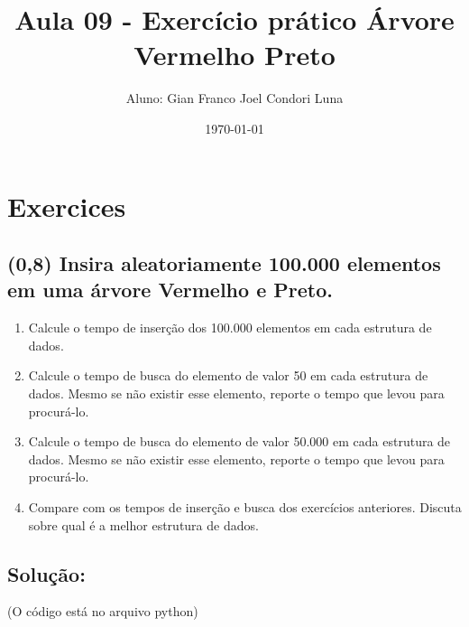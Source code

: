 \documentclass{article}
\title{Aula 09 - Exercício prático Árvore Vermelho Preto}
\author{Aluno: Gian Franco Joel Condori Luna}
\date{\today}
\begin{document}
\maketitle

\section*{Exercices}
\setcounter{section}{1}
\subsection {(0,8) Insira aleatoriamente 100.000 elementos em uma árvore Vermelho e Preto.}
\begin{enumerate}[label=\alph*)]
    \item Calcule o tempo de inserção dos 100.000 elementos em cada estrutura de dados.
    \item Calcule o tempo de busca do elemento de valor 50 em cada estrutura de dados.
    Mesmo se não existir esse elemento, reporte o tempo que levou para procurá-lo.
    \item Calcule o tempo de busca do elemento de valor 50.000 em cada estrutura de
    dados. Mesmo se não existir esse elemento, reporte o tempo que levou para
    procurá-lo.
    \item Compare com os tempos de inserção e busca dos exercícios anteriores. Discuta
    sobre qual é a melhor estrutura de dados.
\end{enumerate}

\subsection*{Solução:}

(O código está no arquivo python)
\\
\end{document}
